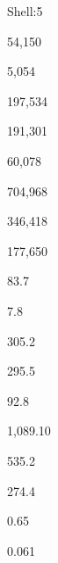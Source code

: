 \documentclass[a4paper,portrait,12pt]{article}
\begin{document}
\begin{flushleft}
Shell:5
\end{flushleft}





54,150





5,054





197,534





191,301





60,078





704,968





346,418





177,650





83.7





7.8





305.2





295.5





92.8





1,089.10





535.2





274.4





0.65





0.061
\end{document}
